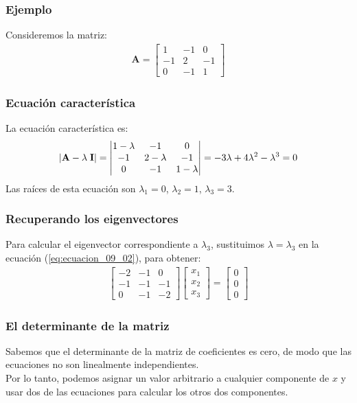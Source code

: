 \documentclass[12pt]{beamer}
\begin{document}
\begin{frame}
\frametitle{Ejemplo}
Consideremos la matriz:
\pause
\begin{align}
\mathbf{A} = \begin{bmatrix}
1 & -1 & 0 \\
-1 & 2 & -1 \\
0 & -1 & 1
\end{bmatrix}
\label{eq:ecuacion_09_a}
\end{align}
\end{frame}
\begin{frame}
\frametitle{Ecuación característica}
La ecuación característica es:
\pause
\begin{align}
\abs{ \mathbf{A} - \lambda \; \mathbf{I} }=  \begin{vmatrix}
1 - \lambda & -1 & 0 \\
-1 & 2 - \lambda & -1 \\
0 & -1 & 1 - \lambda
\end{vmatrix} 
= -3 \lambda +  4 \lambda^{2} - \lambda^{3} = 0
\label{eq:ecuacion_09_b}
\end{align}
\pause
Las raíces de esta ecuación son $\lambda_{1} = 0$, $\lambda_{2} = 1$, $\lambda_{3} = 3$.
\end{frame}
\begin{frame}
\frametitle{Recuperando los eigenvectores}
Para calcular el eigenvector correspondiente a $\lambda_{3}$, \pause sustituimos $\lambda = \lambda_{3}$ en la ecuación (\ref{eq:ecuacion_09_02}), para obtener:
\pause
\begin{align}
\begin{bmatrix}
-2 & -1 & 0 \\
-1 & -1 & -1 \\
0 & -1 & -2
\end{bmatrix}
\begin{bmatrix}
x_{1} \\
x_{2} \\
x_{3} 
\end{bmatrix} = 
\begin{bmatrix}
0 \\
0 \\
0
\end{bmatrix}
\label{eq:ecuacion_09_c}
\end{align}
\end{frame}
\begin{frame}
\frametitle{El determinante de la matriz}
Sabemos que el determinante de la matriz de coeficientes es cero, de modo que las ecuaciones no son linealmente independientes. 
\\
\bigskip
\pause
Por lo tanto, podemos asignar un valor arbitrario a cualquier componente de $x$ y usar dos de las ecuaciones para calcular los otros dos componentes.
\end{frame}
\end{document}
